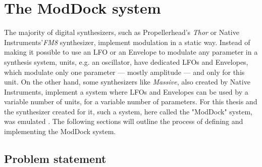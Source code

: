 \documentclass[12pt,twoside]{report}
\begin{document}
\pagebreak

\section{The ModDock system}

The majority of digital synthesizers, such as Propellerhead's\footnotemark{} \emph{Thor} or Native Instruments'\footnotemark[2] \emph{FM8} synthesizer, implement modulation in a static way. Instead of making it possible to use an LFO or an Envelope to modulate any parameter in a synthesis system, units, e.g. an oscillator, have dedicated LFOs and Envelopes, which modulate only one parameter --- mostly amplitude --- and only for this unit. On the other hand, some synthesizers like \emph{Massive}, also created by Native Instruments, implement a system where LFOs and Envelopes can be used by a variable number of units, for a variable number of parameters. For this thesis and the synthesizer created for it, such a system, here called the "ModDock" system, was emulated \footnotemark. The following sections will outline the process of defining and implementing the ModDock system.



\subsection{Problem statement}
\end{document}
